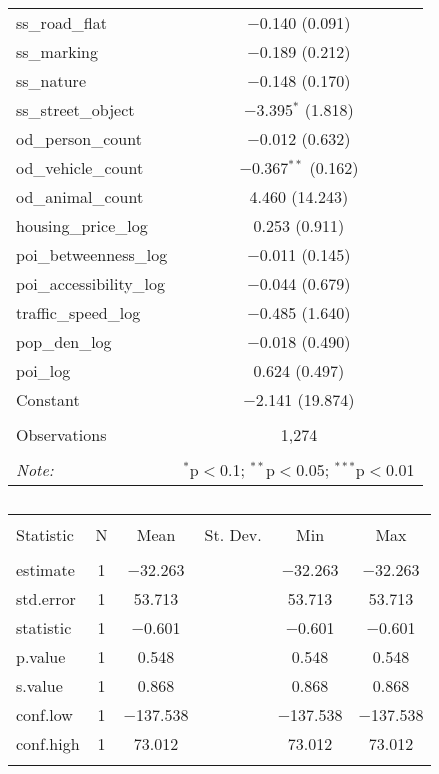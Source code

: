 \begin{table}[!htbp]
\begin{tabular}{@{\extracolsep{1pt}}lc}
  ss\_road\_flat & $-$0.140 (0.091) \\ 
  ss\_marking & $-$0.189 (0.212) \\ 
  ss\_nature & $-$0.148 (0.170) \\ 
  ss\_street\_object & $-$3.395$^{*}$ (1.818) \\ 
  od\_person\_count & $-$0.012 (0.632) \\ 
  od\_vehicle\_count & $-$0.367$^{**}$ (0.162) \\ 
  od\_animal\_count & 4.460 (14.243) \\ 
  housing\_price\_log & 0.253 (0.911) \\ 
  poi\_betweenness\_log & $-$0.011 (0.145) \\ 
  poi\_accessibility\_log & $-$0.044 (0.679) \\ 
  traffic\_speed\_log & $-$0.485 (1.640) \\ 
  pop\_den\_log & $-$0.018 (0.490) \\ 
  poi\_log & 0.624 (0.497) \\ 
  Constant & $-$2.141 (19.874) \\ 
 \hline \\[-1.8ex] 
Observations & 1,274 \\ 
\hline 
\hline \\[-1.8ex] 
\textit{Note:}  & \multicolumn{1}{r}{$^{*}$p$<$0.1; $^{**}$p$<$0.05; $^{***}$p$<$0.01} \\ 
\end{tabular} 
\end{table} 

\begin{table}[!htbp] \centering 
  \caption{} 
  \label{} 
\small 
\begin{tabular}{@{\extracolsep{1pt}}lccccc} 
\\[-1.8ex]\hline 
\hline \\[-1.8ex] 
Statistic & \multicolumn{1}{c}{N} & \multicolumn{1}{c}{Mean} & \multicolumn{1}{c}{St. Dev.} & \multicolumn{1}{c}{Min} & \multicolumn{1}{c}{Max} \\ 
\hline \\[-1.8ex] 
estimate & 1 & $-$32.263 &  & $-$32.263 & $-$32.263 \\ 
std.error & 1 & 53.713 &  & 53.713 & 53.713 \\ 
statistic & 1 & $-$0.601 &  & $-$0.601 & $-$0.601 \\ 
p.value & 1 & 0.548 &  & 0.548 & 0.548 \\ 
s.value & 1 & 0.868 &  & 0.868 & 0.868 \\ 
conf.low & 1 & $-$137.538 &  & $-$137.538 & $-$137.538 \\ 
conf.high & 1 & 73.012 &  & 73.012 & 73.012 \\ 
\hline \\[-1.8ex] 
\end{tabular} 
\end{table} 

